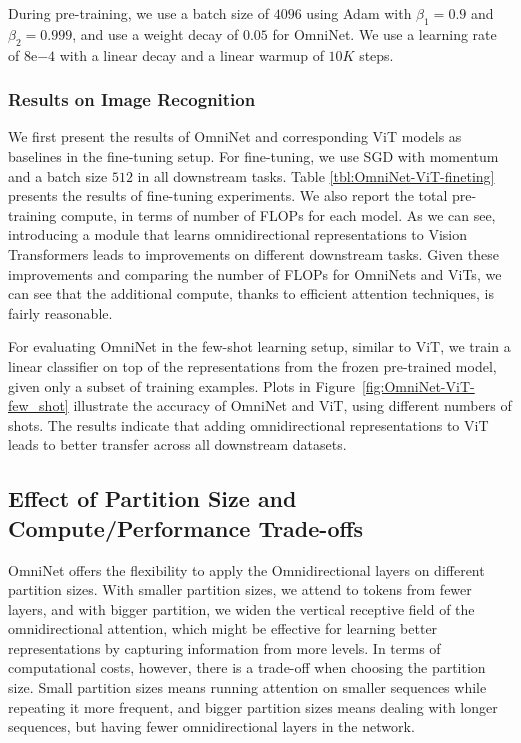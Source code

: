 \documentclass{article}
\begin{document}
During pre-training, we use a batch size of $4096$ using Adam with $\beta_1=0.9$ and $\beta_2=0.999$, and use a weight decay of $0.05$ for OmniNet. We use a learning rate of $8\mathrm{e}{-4}$ with a linear decay and a linear warmup of $10K$ steps.


\subsubsection{Results on Image Recognition}
We first present the results of OmniNet and corresponding ViT models as baselines in the fine-tuning setup. For fine-tuning, we use SGD with momentum and a batch size $512$ in all downstream tasks. 
Table \ref{tbl:OmniNet-ViT-fineting} presents the results of fine-tuning experiments. We also report the total pre-training compute, in terms of number of FLOPs for each model. As we can see, introducing a module that learns omnidirectional representations to Vision Transformers leads to improvements on different downstream tasks. Given these improvements and comparing the number of FLOPs for OmniNets and ViTs, we can see that the additional compute, thanks to efficient attention techniques, is fairly reasonable.

For evaluating OmniNet in the few-shot learning setup, similar to ViT, we train a linear classifier on top of the representations from the frozen pre-trained model, given only a subset of training examples. Plots in Figure~\ref{fig:OmniNet-ViT-few_shot} illustrate the accuracy of OmniNet and ViT, using different numbers of shots. The results indicate that adding omnidirectional representations to ViT leads to better transfer across all downstream datasets.  


\subsection{Effect of Partition Size and Compute/Performance Trade-offs}
OmniNet offers the flexibility to apply the Omnidirectional layers on different partition sizes. With smaller partition sizes, we attend to tokens from fewer layers, and with bigger partition, we widen the vertical receptive field of the omnidirectional attention, which might be effective for learning better representations by capturing information from more levels. In terms of computational costs, however, there is a trade-off when choosing the partition size. Small partition sizes means running attention on smaller sequences while repeating it more frequent, and bigger partition sizes means dealing with longer sequences, but having fewer omnidirectional layers in the network. 
\end{document}
